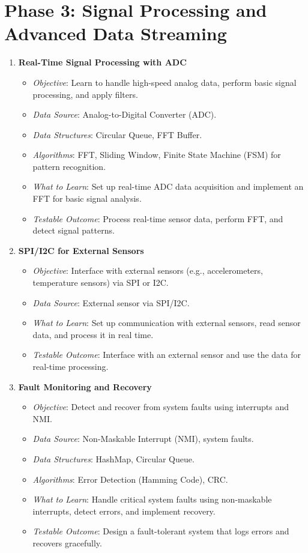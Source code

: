 \documentclass{article}
\begin{document}
\section{Phase 3: Signal Processing and Advanced Data Streaming}
\begin{enumerate}[label=\arabic*.]
    \item \textbf{Real-Time Signal Processing with ADC}
    \begin{itemize}
        \item \textit{Objective}: Learn to handle high-speed analog data, perform basic signal processing, and apply filters.
        \item \textit{Data Source}: Analog-to-Digital Converter (ADC).
        \item \textit{Data Structures}: Circular Queue, FFT Buffer.
        \item \textit{Algorithms}: FFT, Sliding Window, Finite State Machine (FSM) for pattern recognition.
        \item \textit{What to Learn}: Set up real-time ADC data acquisition and implement an FFT for basic signal analysis.
        \item \textit{Testable Outcome}: Process real-time sensor data, perform FFT, and detect signal patterns.
    \end{itemize}

    \item \textbf{SPI/I2C for External Sensors}
    \begin{itemize}
        \item \textit{Objective}: Interface with external sensors (e.g., accelerometers, temperature sensors) via SPI or I2C.
        \item \textit{Data Source}: External sensor via SPI/I2C.
        \item \textit{What to Learn}: Set up communication with external sensors, read sensor data, and process it in real time.
        \item \textit{Testable Outcome}: Interface with an external sensor and use the data for real-time processing.
    \end{itemize}

    \item \textbf{Fault Monitoring and Recovery}
    \begin{itemize}
        \item \textit{Objective}: Detect and recover from system faults using interrupts and NMI.
        \item \textit{Data Source}: Non-Maskable Interrupt (NMI), system faults.
        \item \textit{Data Structures}: HashMap, Circular Queue.
        \item \textit{Algorithms}: Error Detection (Hamming Code), CRC.
        \item \textit{What to Learn}: Handle critical system faults using non-maskable interrupts, detect errors, and implement recovery.
        \item \textit{Testable Outcome}: Design a fault-tolerant system that logs errors and recovers gracefully.
    \end{itemize}
\end{enumerate}
\end{document}
